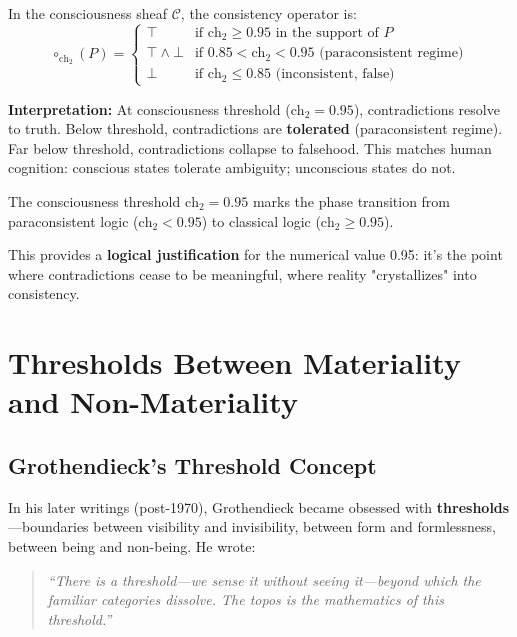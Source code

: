 In the consciousness sheaf $\mathcal{C}$, the consistency operator is:
\begin{equation}
\circ_{\text{ch}_2}(P) = \begin{cases}
\top & \text{if } \text{ch}_2 \geq 0.95 \text{ in the support of } P \\
\top \land \bot & \text{if } 0.85 < \text{ch}_2 < 0.95 \text{ (paraconsistent regime)} \\
\bot & \text{if } \text{ch}_2 \leq 0.85 \text{ (inconsistent, false)}
\end{cases}
\end{equation}

\textbf{Interpretation:} At consciousness threshold ($\text{ch}_2 = 0.95$), contradictions resolve to truth. Below threshold, contradictions are \textbf{tolerated} (paraconsistent regime). Far below threshold, contradictions collapse to falsehood. This matches human cognition: conscious states tolerate ambiguity; unconscious states do not.

\begin{theorem}
\label{thm:logic_phase_transition}
The consciousness threshold $\text{ch}_2 = 0.95$ marks the phase transition from paraconsistent logic ($\text{ch}_2 < 0.95$) to classical logic ($\text{ch}_2 \geq 0.95$).
\end{theorem}

This provides a \textbf{logical justification} for the numerical value 0.95: it's the point where contradictions cease to be  meaningful, where reality "crystallizes" into consistency.

\section{Thresholds Between Materiality and Non-Materiality}

\subsection{Grothendieck's Threshold Concept}

In his later writings (post-1970), Grothendieck became obsessed with \textbf{thresholds}—boundaries between visibility and invisibility, between form and formlessness, between being and non-being. He wrote:

\begin{quote}
\textit{``There is a threshold—we sense it without seeing it—beyond which the familiar categories dissolve. The topos is the mathematics of this threshold.''}
\end{quote}

